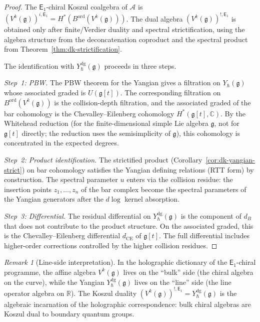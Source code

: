 \documentclass[11pt,reqno]{amsart}
\theoremstyle{definition}
\theoremstyle{remark}
\newtheorem{remark}[theorem]{Remark}
\newcommand{\cA}{\mathcal{A}}
\newcommand{\Eone}{\mathsf{E}_{1}}
\newcommand{\fg}{\mathfrak{g}}
\newcommand{\Ydg}{Y^{\mathrm{dg}}}
\newcommand{\CC}{\mathbb{C}}
\newcommand{\RR}{\mathbb{R}}
\numberwithin{equation}{section}
\begin{document}
\begin{proof}
The $\Eone$-chiral Koszul coalgebra of $\cA$ is
$(V^k(\fg))^{i,\Eone}=H^*(B^{\mathrm{ord}}(V^k(\fg)))$.
The dual algebra $(V^k(\fg))^{!,\Eone}$ is obtained only after
finite/Verdier duality and spectral strictification, using the
algebra structure from the deconcatenation coproduct and the spectral
product from
Theorem~\ref{thm:dk-strictification}.

The identification with $\Ydg_\hbar(\fg)$ proceeds in
three steps.

\emph{Step~1: PBW.}
The PBW theorem for the Yangian gives a filtration on
$Y_\hbar(\fg)$ whose associated graded is
$U(\fg[t])$.  The corresponding filtration on
$B^{\mathrm{ord}}(V^k(\fg))$ is the collision-depth
filtration, and the associated graded of the bar cohomology
is the Chevalley--Eilenberg cohomology
$H^*(\fg[t], \CC)$.  By the Whitehead reduction (for
the finite-dimensional simple Lie algebra $\fg$, not for
$\fg[t]$ directly; the reduction uses the semisimplicity
of $\fg$), this cohomology is concentrated in the expected
degrees.

\emph{Step~2: Product identification.}
The strictified product
(Corollary~\ref{cor:dk-yangian-strict}) on bar cohomology
satisfies the Yangian defining relations (RTT form) by
construction.  The spectral parameter $u$ enters via the
collision residue: the insertion points $z_1, \ldots, z_n$
of the bar complex become the spectral parameters of the
Yangian generators after the $d\log$ kernel absorption.

\emph{Step~3: Differential.}
The residual differential on $\Ydg_\hbar(\fg)$ is the
component of $d_B$ that does not contribute to the product
structure.  On the associated graded, this is the
Chevalley--Eilenberg differential $d_{\mathrm{CE}}$ of
$\fg[t]$.  The full differential includes higher-order
corrections controlled by the higher collision residues.
\end{proof}

\begin{remark}[Line-side interpretation]
In the holographic dictionary of the $\Eone$-chiral
programme, the affine algebra $V^k(\fg)$ lives on the
``bulk'' side (the chiral algebra on the curve), while the
Yangian $\Ydg_\hbar(\fg)$ lives on the ``line'' side (the
line operator algebra on $\RR$).  The Koszul duality
$(V^k(\fg))^{!,\Eone} = \Ydg_\hbar(\fg)$
is the algebraic incarnation of the holographic
correspondence: bulk chiral algebras are Koszul dual to
boundary quantum groups.
\end{remark}
\end{document}
